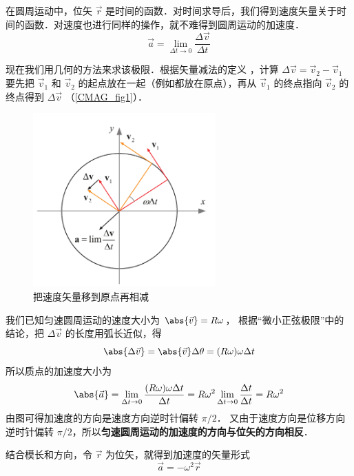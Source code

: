 

在圆周运动中，位矢 $\vec r$ 是时间的函数．对时间求导后，我们得到速度矢量关于时间的函数．对速度也进行同样的操作，就不难得到圆周运动的加速度．
\begin{equation}
\vec a = \lim_{\Delta t \to 0} \frac{\Delta \vec v}{\Delta t}
\end{equation}

现在我们用几何的方法来求该极限．根据矢量减法的定义%
，计算 $\Delta \vec v = \vec v_2 - \vec v_1$ 要先把 $\vec v_1$ 和 $\vec v_2$ 的起点放在一起（例如都放在原点），再从 $\vec v_1$ 的终点指向 $\vec v_2$ 的终点得到 $\Delta \vec v$ （\autoref{CMAG_fig1}）． 

\begin{figure}[ht]
\centering
\includegraphics[width=7cm]{./figures/CMAG.pdf}
\caption{把速度矢量移到原点再相减}\label{CMAG_fig1}
\end{figure}

我们已知匀速圆周运动的速度大小为 $\abs{\vec v} = R\omega$， 根据“微小正弦极限”中的结论，把 $\Delta\vec v$ 的长度用弧长近似，得
\begin{equation}
\abs{\Delta \vec v} = \abs{\vec v}\Delta \theta  = (R\omega)\omega \Delta t
\end{equation}
所以质点的加速度大小为
\begin{equation}
\abs{\vec a} = \lim_{\Delta t \to 0} \frac{(R\omega)\omega \Delta t}{\Delta t} = R \omega ^2 \lim_{\Delta t \to 0} \frac{\Delta t}{\Delta t} = R \omega ^2
\end{equation}
由图可得加速度的方向是速度方向逆时针偏转 $\pi/2$． 又由于速度方向是位移方向逆时针偏转 $\pi/2$，所以\textbf{匀速圆周运动的加速度的方向与位矢的方向相反}．

结合模长和方向，令 $\vec r$ 为位矢，就得到加速度的矢量形式
\begin{equation}
\vec a =  - \omega ^2 \vec r
\end{equation}


















